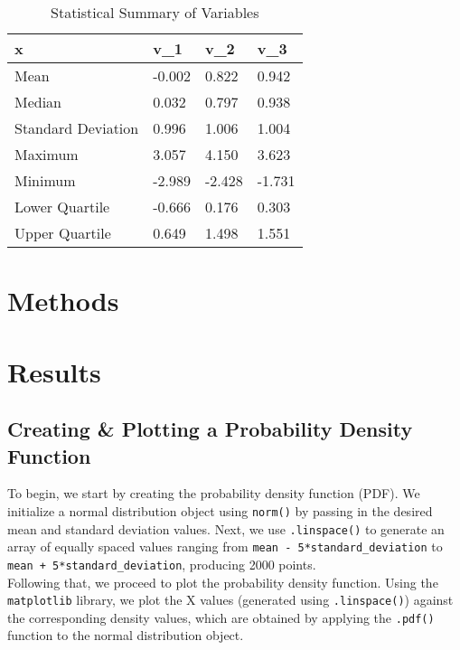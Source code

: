 \documentclass[a4paper,twocolumn]{article}
\begin{document}
\begin{table}[htbp]
    \centering
    \renewcommand{\arraystretch}{1.2} 
    \begin{tabular}{|l|p{1cm}|p{1cm}|p{1cm}|} 
        \hline
        \textbf{x} & \textbf{v\_1} & \textbf{v\_2} & \textbf{v\_3} \\
        \hline
        Mean                & -0.002  & 0.822  & 0.942  \\
        Median              & 0.032   & 0.797  & 0.938  \\
        Standard Deviation  & 0.996   & 1.006  & 1.004  \\
        Maximum             & 3.057   & 4.150  & 3.623  \\
        Minimum             & -2.989  & -2.428 & -1.731 \\
        Lower Quartile      & -0.666  & 0.176  & 0.303  \\
        Upper Quartile      & 0.649   & 1.498  & 1.551  \\
        \hline
    \end{tabular}
    \caption{Statistical Summary of Variables}
    \label{tab:summary}
\end{table}

\section{Methods}

\section{Results}

\subsection{Creating \& Plotting a Probability Density Function}
To begin, we start by creating the probability density function (PDF). We initialize a normal distribution object
 using \texttt{norm()} by passing in the desired mean and standard deviation values. Next, we use \texttt{.linspace()} 
 to generate an array of equally spaced values ranging from \texttt{mean - 5*standard\_deviation} to 
 \texttt{mean + 5*standard\_deviation}, producing 2000 points. \\

Following that, we proceed to plot the probability density function. Using the \texttt{matplotlib} library, we plot 
the X values (generated using \texttt{.linspace()}) against the corresponding density values, which are obtained by
applying the \texttt{.pdf()} function to the normal distribution object. \\
\end{document}
